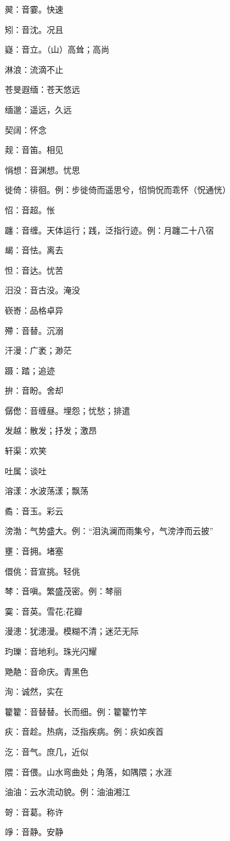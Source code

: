 翜：音霎。快速

矧：音沈。况且

嶷：音立。（山）高耸；高尚

淋浪：流滴不止

苍旻遐缅：苍天悠远

缅邈：遥远，久远

契阔：怀念

觌：音笛。相见

悁想：音渊想。忧思

徙倚：徘徊。例：步徙倚而遥思兮，怊惝怳而乖怀（怳通恍）

怊：音超。怅

躔：音缠。天体运行；践，泛指行迹。例：月躔二十八宿

朅：音怯。离去

怛：音达。忧苦

汨没：音古没。淹没

嵚㟢：品格卓异

殢：音替。沉溺

汗漫：广袤；渺茫

蹑：踏；追迹

拚：音盼。舍却

僝僽：音缠昼。埋怨；忧愁；排遣

发越：散发；抒发；激昂

轩渠：欢笑

吐属：谈吐

溶漾：水波荡漾；飘荡

矞：音玉。彩云

滂渤：气势盛大。例：“泪汍澜而雨集兮，气滂浡而云披”

壅：音拥。堵塞

儇佻：音宣挑。轻佻

棽：音嗔。繁盛茂密。例：棽丽

霙：音英。雪花;花瓣

漫漶：犹漶漫。模糊不清；迷茫无际

玓瓅：音地利。珠光闪耀

䒌靘：音命庆。青黑色

洵：诚然，实在

籊籊：音替替。长而细。例：籊籊竹竿

疢：音趁。热病，泛指疾病。例：疢如疾首

汔：音气。庶几，近似

隈：音偎。山水弯曲处；角落，如隅隈；水涯

油油：云水流动貌。例：油油湘江

哿：音葛。称许

竫：音静。安静

